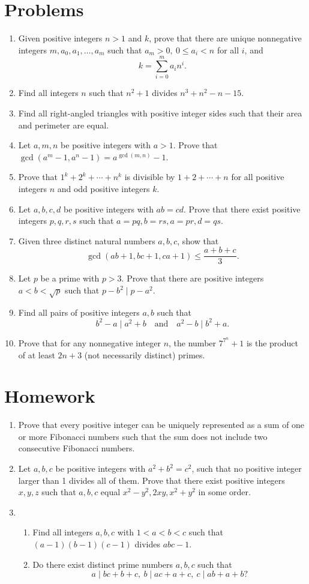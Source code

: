 \documentclass{article}
\begin{document}
\section{Problems}
  \begin{enumerate}
    \item Given positive integers $n>1$ and $k$, prove that there are unique
      nonnegative integers $m,a_0,a_1,\ldots,a_m$ such that $a_m>0,\ 0\le
      a_i<n$ for all $i$, and
      \[k=\sum_{i=0}^m a_i n^i.\]
    \item Find all integers $n$ such that $n^2+1$ divides $n^3+n^2-n-15$.
    \item Find all right-angled triangles with positive integer sides 
      such that their area and perimeter are equal.
    \item Let $a,m,n$ be positive integers with $a>1$.
      Prove that $\gcd(a^m-1,a^n-1)=a^{\gcd(m,n)}-1$.
    \item Prove that $1^k+2^k+\cdots+n^k$ is divisible by $1+2+\cdots+n$ for
      all positive integers $n$ and odd positive integers $k$.
    \item Let $a,b,c,d$ be positive integers with $ab=cd$. Prove that there
      exist positive integers $p,q,r,s$ such that \(a=pq,b=rs,a=pr,d=qs\).
    \item Given three distinct natural numbers $a,b,c$, show that
      \[\gcd(ab+1,bc+1,ca+1)\le\frac{a+b+c}3.\]
    \item Let $p$ be a prime with $p>3$. Prove that there are positive integers
      $a<b<\sqrt p$ such that $p-b^2\mid p-a^2$.
    \item Find all pairs of positive integers $a,b$ such that \[b^2-a\mid
        a^2+b\quad\text{and}\quad a^2-b\mid b^2+a.\]
    \item Prove that for any nonnegative integer $n$, the number $7^{7^n}+1$ is
      the product of at least $2n+3$ (not necessarily distinct) primes.
  \end{enumerate}
\newpage
\section{Homework}
  \begin{enumerate}
    \item Prove that every positive integer can be uniquely represented as a sum
      of one or more Fibonacci numbers such that the sum does not include two
      consecutive Fibonacci numbers.
    \item Let $a, b, c$ be positive integers with $a^2+b^2=c^2$, such that no
      positive integer larger than 1 divides all of them. Prove that
      there exist positive integers $x,y,z$ such that $a,b,c$ equal
      $x^2-y^2,2xy,x^2+y^2$ in some order.
    \item
      \begin{enumerate}
        \item Find all integers $a,b,c$ with $1<a<b<c$ such that $(a-1)(b-1)(c-1)$
          divides $abc-1$.
        \item Do there exist distinct prime numbers $a,b,c$ such that
          \[a\mid bc+b+c,\ b\mid ac+a+c,\ c\mid ab+a+b?\]
      \end{enumerate}
  \end{enumerate}
\end{document}
